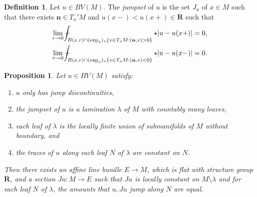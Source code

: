 \documentclass[reqno,10pt]{amsart}
\newcommand{\RR}{\mathbf{R}}
\newcommand{\normal}{\mathbf n}
\newcommand{\dfn}[1]{\emph{#1}\index{#1}}
\newtheorem{proposition}[theorem]{Proposition}
\theoremstyle{definition}
\newtheorem{definition}[theorem]{Definition}
\numberwithin{equation}{section}
\def\Xint#1{\mathchoice
{\XXint\displaystyle\textstyle{#1}}%
{\XXint\textstyle\scriptstyle{#1}}%
{\XXint\scriptstyle\scriptscriptstyle{#1}}%
{\XXint\scriptscriptstyle\scriptscriptstyle{#1}}%
\!\int}
\def\XXint#1#2#3{{\setbox0=\hbox{$#1{#2#3}{\int}$ }
\vcenter{\hbox{$#2#3$ }}\kern-.6\wd0}}
\def\dashint{\Xint-}
\begin{document}
\begin{definition}
Let $u \in BV(M)$. The \dfn{jumpset} of $u$ is the set $J_u$ of $x \in M$ such that there exists $\normal \in T_x'M$ and $u(x-) < u(x+) \in \RR$ such that 
\begin{align*}
\lim_{r \to 0} \dashint_{B(x, r) \cap (\exp_x)_* \{v \in T_xM: (\normal, v) > 0\}} \star |u - u(x+)|  & = 0, \\
\lim_{r \to 0} \dashint_{B(x, r) \cap (\exp_x)_* \{v \in T_xM: (\normal, v) < 0\}} \star |u - u(x-)|  & = 0.
\end{align*}
\end{definition}

\begin{proposition}\label{existence of jump graphs}
Let $u \in BV(M)$ satisfy:
\begin{enumerate}
\item $u$ only has jump discontinuities,
\item the jumpset of $u$ is a lamination $\lambda$ of $M$ with countably many leaves,
\item each leaf of $\lambda$ is the locally finite union of submanifolds of $M$ without boundary, and
\item the traces of $u$ along each leaf $N$ of $\lambda$ are constant on $N$.
\end{enumerate}
Then there exists an affine line bundle $E \to M$, which is flat with structure group $\RR$, and a section $Ju: M \to E$ such that $Ju$ is locally constant on $M \setminus \lambda$ and for each leaf $N$ of $\lambda$, the amounts that $u, Ju$ jump along $N$ are equal.
\end{proposition}
\end{document}
